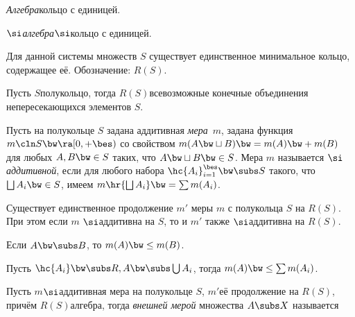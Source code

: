 \documentclass[a4paper]{article}
\begin{document}
\begin{df}
  \emph{Алгебра}\т кольцо с единицей.
\end{df}

\begin{df}
  \emph{$\si$\д алгебра}\т $\si$\д кольцо с единицей.
\end{df}

\begin{theorem}
  Для данной системы множеств $S$ существует единственное минимальное кольцо,
  содержащее её. Обозначение: $R(S)$.
\end{theorem}

\begin{theorem}
  Пусть $S$\т полукольцо, тогда $R(S)$\т всевозможные конечные
  объединения непересекающихся элементов $S$.
\end{theorem}

\begin{df}
  Пусть на полукольце $S$ задана аддитивная \emph{мера}~$m$,  задана функция
  $m\cln S \bw\ra [0,+\bes)$ со свойством $m(A \bw\sqcup B) \bw= m(A) \bw+ m(B)$ для любых
  $A,B \bw\in S$ таких, что $A \bw\sqcup B \bw\in S$.
  Мера $m$ называется \emph{$\si$\д аддитивной}, если для любого набора
  $\hc{A_i}_{i=1}^\bes \bw\subs S$ такого, что $\bigsqcup A_i \bw\in S$, имеем
  $m\hr{\bigsqcup A_i} \bw= \sum m(A_i)$.
\end{df}

\begin{theorem}
  Существует единственное продолжение $m'$ меры $m$ с полукольца $S$ на $R(S)$.
  При этом если $m$ $\si$\д аддитивна на $S$, то
  и $m'$ также $\si$\д аддитивна на $R(S)$.
\end{theorem}

\begin{theorem}
  Если $A \bw\subs B$, то $m(A) \bw\le m(B)$.
\end{theorem}

\begin{theorem}
  Пусть $\hc{A_i} \bw\subs R, A \bw\subs \bigcup A_i$, тогда $m(A) \bw\le \sum m(A_i)$.
\end{theorem}

\begin{df}
  Пусть $m$\т $\si$\д аддитивная мера на полукольце $S$,
  $m'$\т её продолжение на $R(S)$, причём $R(S)$\т алгебра,
  тогда \emph{внешней мерой} множества $A\subs X$ называется
\end{df}
\end{document}
